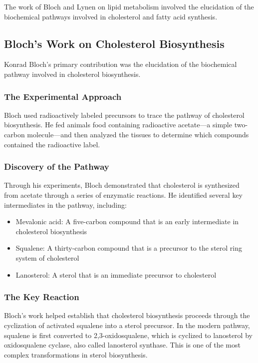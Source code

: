 The work of Bloch and Lynen on lipid metabolism involved the elucidation of the biochemical pathways involved in cholesterol and fatty acid synthesis.

\subsection{Bloch's Work on Cholesterol Biosynthesis}

Konrad Bloch's primary contribution was the elucidation of the biochemical pathway involved in cholesterol biosynthesis.

\subsubsection{The Experimental Approach}

Bloch used radioactively labeled precursors to trace the pathway of cholesterol biosynthesis. He fed animals food containing radioactive acetate---a simple two-carbon molecule---and then analyzed the tissues to determine which compounds contained the radioactive label.

\subsubsection{Discovery of the Pathway}

Through his experiments, Bloch demonstrated that cholesterol is synthesized from acetate through a series of enzymatic reactions. He identified several key intermediates in the pathway, including:

\begin{itemize}
\item Mevalonic acid: A five-carbon compound that is an early intermediate in cholesterol biosynthesis
\item Squalene: A thirty-carbon compound that is a precursor to the sterol ring system of cholesterol
\item Lanosterol: A sterol that is an immediate precursor to cholesterol
\end{itemize}

\subsubsection{The Key Reaction}

Bloch's work helped establish that cholesterol biosynthesis proceeds through the cyclization of activated squalene into a sterol precursor. In the modern pathway, squalene is first converted to 2,3-oxidosqualene, which is cyclized to lanosterol by oxidosqualene cyclase, also called lanosterol synthase. This is one of the most complex transformations in sterol biosynthesis.

